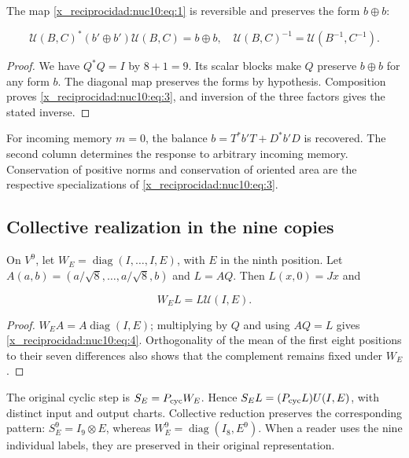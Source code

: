\begin{theorem}
The map \eqref{x_reciprocidad:nuc10:eq:1} is reversible and preserves the form \(b\oplus b\):



\begin{equation}
\mathcal U(B,C)^*(b'\oplus b')\mathcal U(B,C)=b\oplus b,
\quad\mathcal U(B,C)^{-1}=\mathcal U(B^{-1},C^{-1}).
\label{x_reciprocidad:nuc10:eq:3}
\end{equation}
\end{theorem}



\begin{proof}
We have \(Q^*Q=I\) by \(8+1=9\). Its scalar blocks make \(Q\) preserve \(b\oplus b\) for any form \(b\). The diagonal map preserves the forms by hypothesis. Composition proves \eqref{x_reciprocidad:nuc10:eq:3}, and inversion of the three factors gives the stated inverse.
\end{proof}

For incoming memory \(m=0\), the balance \(b=T^*b'T+D^*b'D\) is recovered. The second column determines the response to arbitrary incoming memory. Conservation of positive norms and conservation of oriented area are the respective specializations of \eqref{x_reciprocidad:nuc10:eq:3}.

\subsection{Collective realization in the nine copies}

On \(V^9\), let \(W_E=\operatorname{diag}(I,\ldots,I,E)\), with \(E\) in the ninth position. Let \(A(a,b)=(a/\sqrt8,\ldots,a/\sqrt8,b)\) and \(L=AQ\). Then \(L(x,0)=Jx\) and



\begin{equation}
W_E L=L\mathcal U(I,E).
\label{x_reciprocidad:nuc10:eq:4}
\end{equation}



\begin{proof}
\(W_EA=A\operatorname{diag}(I,E)\); multiplying by \(Q\) and using \(AQ=L\) gives \eqref{x_reciprocidad:nuc10:eq:4}. Orthogonality of the mean of the first eight positions to their seven differences also shows that the complement remains fixed under \(W_E\).
\end{proof}

The original cyclic step is \(S_E=P_{\rm cyc}W_E\). Hence \(S_EL=(P_{\rm cyc}L)U(I,E)\), with distinct input and output charts. Collective reduction preserves the corresponding pattern: \(S_E^9=I_9\otimes E\), whereas \(W_E^9=\operatorname{diag}(I_8,E^9)\). When a reader uses the nine individual labels, they are preserved in their original representation.

